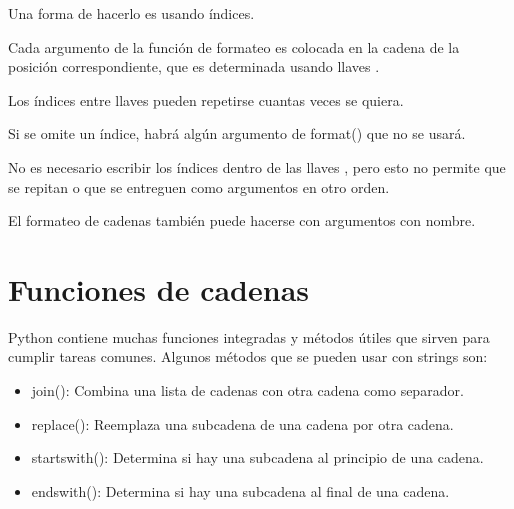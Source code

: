 \documentclass{report}
\begin{document}
{Una forma de hacerlo es usando índices.


Cada argumento de la función de formateo es colocada en la cadena de la posición correspondiente, que es determinada usando llaves {}.

Los índices entre llaves {} pueden repetirse cuantas veces se quiera.


Si se omite un índice, habrá algún argumento de format() que no se usará.


No es necesario escribir los índices dentro de las llaves {}, pero esto no permite que se repitan o que se entreguen como argumentos en otro orden.


El formateo de cadenas también puede hacerse con argumentos con nombre.


\section{Funciones de cadenas}

Python contiene muchas funciones integradas y métodos útiles que sirven para cumplir tareas comunes. Algunos métodos que se pueden usar con strings son:

\begin{itemize}
  \item join(): Combina una lista de cadenas con otra cadena como separador.
  

  \item replace(): Reemplaza una subcadena de una cadena por otra cadena.


  \item startswith(): Determina si hay una subcadena al principio de una cadena.


  \item endswith(): Determina si hay una subcadena al final de una cadena.
  

\end{itemize}}
\end{document}
